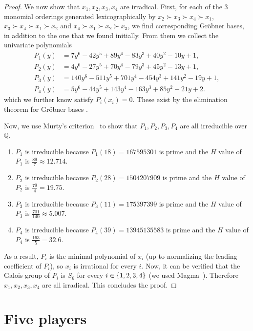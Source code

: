 \documentclass[preprint,12pt,authoryear]{elsarticle}
\newcommand{\Q}{\mathbb{Q}}
\DeclarePairedDelimiter{\ios}{\{}{\}}
\newcommand{\s}{\ios*}
\begin{document}
\begin{proof}
  We now show that $x_1,x_2,x_3,x_4$ are irradical.
  First, for each of the 3 monomial orderings generated lexicographically by $x_2\succ 
  x_3\succ x_4\succ x_1$, $x_3\succ x_4\succ x_1\succ x_2$ and $x_4\succ x_1\succ x_2\succ 
  x_3$, we find corresponding Gr\"obner bases, in addition to the 
  one that we found initially. From them we collect the univariate polynomials
  \begin{align*}
    P_1(y)&=7y^6-42y^5+89y^4-83y^3+40y^2-10y+1,\\
    P_2(y)&=4y^6-27y^5+70y^4-79y^3+45y^2-13y+1,\\
    P_3(y)&=140y^6-511y^5+701y^4-454y^3+141y^2-19y+1,\\
    P_4(y)&=5y^6-44y^5+143y^4-163y^3+85y^2-21y+2.
  \end{align*}
  which we further know satisfy $P_i(x_i)=0$. These exist by the elimination theorem for 
  Gr\"obner bases \citep{cox1997ideals}.

  Now, we use Murty's criterion~\citep{murty2002prime} to show that $P_1,P_2,P_3,P_4$ are 
  all irreducible over $\Q$.
  \begin{enumerate}
    \item $P_1$ is irreducible because $P_1(18)=167595301$ is prime and the $H$ value of 
      $P_1$ is $\frac{89}{7}\approx12.714$.
    \item $P_2$ is irreducible because $P_2(28)=1504207909$ is prime and the $H$ value of 
      $P_2$ is $\frac{79}{4}=19.75$.
    \item $P_3$ is irreducible because $P_3(11)=175397399$ is prime and the $H$ value of 
      $P_3$ is $\frac{701}{140}\approx5.007$.
    \item $P_4$ is irreducible because $P_4(39)=13945135583$ is prime and the $H$ value of 
      $P_4$ is $\frac{163}{5}=32.6$.
  \end{enumerate}
  
  As a result, $P_i$ is the minimal polynomial of $x_i$ (up to normalizing the leading 
  coefficient of $P_i$), so $x_i$ is irrational for every $i$. Now, it can be verified that 
  the Galois group of $P_i$ is $S_6$ for every $i\in\s{1,2,3,4}$ (we used 
  Magma~\citep{MR1484478}). Therefore $x_1,x_2,x_3,x_4$ are all irradical.
  This concludes the proof.
\end{proof}



\section{Five players}\label{sec:5}
\end{document}
